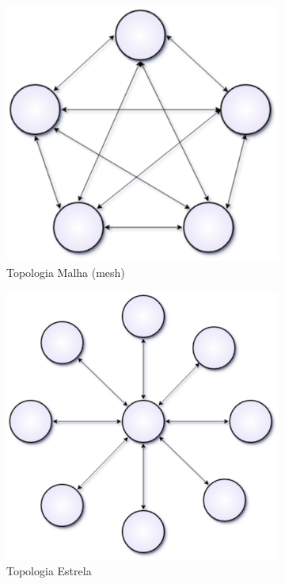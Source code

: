 \documentclass[tcc,capa]{texufpel}
\begin{document}
\begin{figure}[h]
\begin{subfigure}{.24\textwidth}
  \centering
  \includegraphics[width=.8\linewidth]{figs/mesh.png}
  \caption{Topologia Malha (mesh)}
  \label{fig:mesh}
\end{subfigure}%
\begin{subfigure}{.24\textwidth}
  \centering
  \includegraphics[width=.8\linewidth]{figs/star.png}
  \caption{Topologia Estrela}
  \label{fig:star}
\end{subfigure}
\begin{subfigure}{.24\textwidth}
  \centering

\end{subfigure}
\end{figure}
\end{document}
